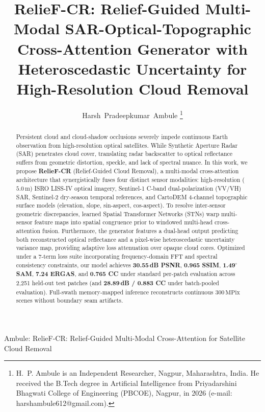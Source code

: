\documentclass[journal,twocolumn]{IEEEtran}
\begin{document}
\title{RelieF-CR: Relief-Guided Multi-Modal SAR-Optical-Topographic Cross-Attention Generator with Heteroscedastic Uncertainty for High-Resolution Cloud Removal}

\author{Harsh~Pradeepkumar~Ambule
\thanks{H.~P. Ambule is an Independent Researcher, Nagpur, Maharashtra, India. He received the B.Tech degree in Artificial Intelligence from Priyadarshini Bhagwati College of Engineering (PBCOE), Nagpur, in 2026 (e-mail: harshambule612@gmail.com).}}

%
{Ambule: RelieF-CR: Relief-Guided Multi-Modal Cross-Attention for Satellite Cloud Removal}

\maketitle

\begin{abstract}
Persistent cloud and cloud-shadow occlusions severely impede continuous Earth observation from high-resolution optical satellites. While Synthetic Aperture Radar (SAR) penetrates cloud cover, translating radar backscatter to optical reflectance suffers from geometric distortion, speckle, and lack of spectral nuance. In this work, we propose \textbf{RelieF-CR} (Relief-Guided Cloud Removal), a multi-modal cross-attention architecture that synergistically fuses four distinct sensor modalities: high-resolution ($5.0\,\text{m}$) ISRO LISS-IV optical imagery, Sentinel-1 C-band dual-polarization (VV/VH) SAR, Sentinel-2 dry-season temporal references, and CartoDEM 4-channel topographic surface models (elevation, slope, sin-aspect, cos-aspect). To resolve inter-sensor geometric discrepancies, learned Spatial Transformer Networks (STNs) warp multi-sensor feature maps into spatial congruence prior to windowed multi-head cross-attention fusion. Furthermore, the generator features a dual-head output predicting both reconstructed optical reflectance and a pixel-wise heteroscedastic uncertainty variance map, providing adaptive loss attenuation over opaque cloud cores. Optimized under a 7-term loss suite incorporating frequency-domain FFT and spectral consistency constraints, our model achieves \textbf{30.55\,dB PSNR}, \textbf{0.965 SSIM}, \textbf{1.49$^\circ$ SAM}, \textbf{7.24 ERGAS}, and \textbf{0.765 CC} under standard per-patch evaluation across 2,251 held-out test patches (and \textbf{28.89\,dB / 0.883 CC} under batch-pooled evaluation). Full-swath memory-mapped inference reconstructs continuous $300\,\text{MPix}$ scenes without boundary seam artifacts.
\end{abstract}
\end{document}

